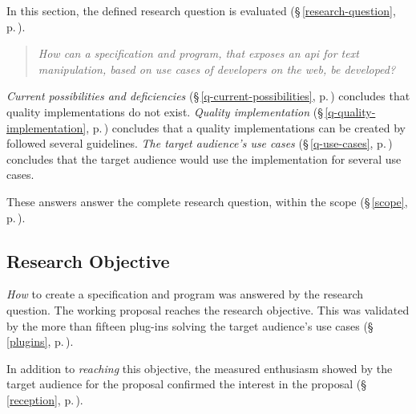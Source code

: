 In this section, the defined research question is evaluated
  (§\,\ref{research-question}, p.\,\pageref{research-question}).

\begin{quote}
  \textit{How can a specification and program, that exposes an \acrshort{api}
    for text manipulation, based on use cases of developers on the web,
    be developed?
  }
\end{quote}

\noindent\emph{Current possibilities and deficiencies}
  (§\,\ref{q-current-possibilities}, p.\,\pageref{q-current-possibilities})
  concludes that quality implementations do not exist.
\emph{Quality implementation} (§\,\ref{q-quality-implementation},
  p.\,\pageref{q-quality-implementation}) concludes that a quality
  implementations can be created by followed several guidelines.
\emph{The target audience's use cases} (§\,\ref{q-use-cases},
  p.\,\pageref{q-use-cases}) concludes that the target audience would use the
  implementation for several use cases.

These answers answer the complete research question, within the scope
  (§\,\ref{scope}, p.\,\pageref{scope}).

\subsection{Research Objective}\label{q-research-objective}

\emph{How} to create a specification and program was answered by the research
  question.
The working proposal reaches the research objective.
This was validated by the more than fifteen plug-ins solving the target
  audience's use cases (§\,\ref{plugins}, p.\,\pageref{plugins}).

In addition to \emph{reaching} this objective, the measured enthusiasm
  showed by the target audience for the proposal confirmed the interest in
  the proposal (§\,\ref{reception}, p.\,\pageref{reception}).
